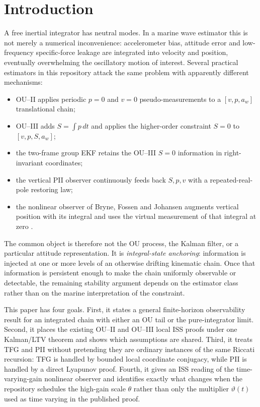 \documentclass[conference]{IEEEtran}
\theoremstyle{remark}
\begin{document}
\section{Introduction}

A free inertial integrator has neutral modes.  In a marine wave estimator this
is not merely a numerical inconvenience: accelerometer bias, attitude error and
low-frequency specific-force leakage are integrated into velocity and
position, eventually overwhelming the oscillatory motion of interest.  Several
practical estimators in this repository attack the same problem with apparently
different mechanisms:
\begin{itemize}
  \item OU--II applies periodic $p=0$ and $v=0$ pseudo-measurements to a
        $[v,p,a_w]$ translational chain;
  \item OU--III adds $S=\int p\,dt$ and applies the higher-order constraint
        $S=0$ to $[v,p,S,a_w]$;
  \item the two-frame group EKF retains the OU--III $S=0$ information in
        right-invariant coordinates;
  \item the vertical PII observer continuously feeds back $S,p,v$ with a
        repeated-real-pole restoring law;
  \item the nonlinear observer of Bryne, Fossen and Johansen augments vertical
        position with its integral and uses the virtual measurement of that
        integral at zero \cite{BryneFossenJohansen2014_TimeVarGain}.
\end{itemize}

The common object is therefore not the OU process, the Kalman filter, or a
particular attitude representation.  It is \emph{integral-state anchoring}:
information is injected at one or more levels of an otherwise drifting
kinematic chain.  Once that information is persistent enough to make the chain
uniformly observable or detectable, the remaining stability argument depends
on the estimator class rather than on the marine interpretation of the
constraint.

This paper has four goals.  First, it states a general finite-horizon
observability result for an integrated chain with either an OU tail or the
pure-integrator limit.  Second, it places the existing OU--II and OU--III local
ISS proofs under one Kalman/LTV theorem and shows which assumptions are shared.
Third, it treats TFG and PII without pretending they are ordinary instances of
the same Riccati recursion: TFG is handled by bounded local coordinate
conjugacy, while PII is handled by a direct Lyapunov proof.  Fourth, it gives an
ISS reading of the time-varying-gain nonlinear observer and identifies exactly
what changes when the repository schedules the high-gain scale $\theta$ rather
than only the multiplier $\vartheta(t)$ used as time varying in the published
proof.
\end{document}
